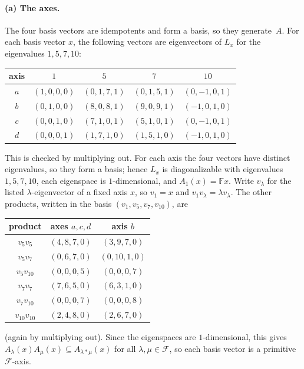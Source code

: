 \documentclass[11pt]{article}
\theoremstyle{remark}
\newcommand{\F}{\mathbb{F}}
\begin{document}
\paragraph{(a) The axes.}
The four basis vectors are idempotents and form a basis, so they generate~$A$.
For each basis vector $x$, the following vectors are eigenvectors of $L_x$ for
the eigenvalues $1,5,7,10$:
\begin{center}
\begin{tabular}{ccccc}
\toprule
axis & $1$ & $5$ & $7$ & $10$\\\midrule
$a$ & $(1,0,0,0)$ & $(0,1,7,1)$ & $(0,1,5,1)$ & $(0,-1,0,1)$\\
$b$ & $(0,1,0,0)$ & $(8,0,8,1)$ & $(9,0,9,1)$ & $(-1,0,1,0)$\\
$c$ & $(0,0,1,0)$ & $(7,1,0,1)$ & $(5,1,0,1)$ & $(0,-1,0,1)$\\
$d$ & $(0,0,0,1)$ & $(1,7,1,0)$ & $(1,5,1,0)$ & $(-1,0,1,0)$\\
\bottomrule
\end{tabular}
\end{center}
This is checked by multiplying out. For each axis the four vectors have distinct
eigenvalues, so they form a basis; hence $L_x$ is diagonalizable with
eigenvalues $1,5,7,10$, each eigenspace is $1$-dimensional, and
$A_1(x)=\F x$. Write $v_\lambda$ for the listed $\lambda$-eigenvector of a
fixed axis $x$, so $v_1=x$ and $v_1v_\lambda=\lambda v_\lambda$. The other
products, written in the basis $(v_1,v_5,v_7,v_{10})$, are
\begin{center}
\begin{tabular}{ccc}
\toprule
product & axes $a,c,d$ & axis $b$\\\midrule
$v_5v_5$ & $(4,8,7,0)$ & $(3,9,7,0)$\\
$v_5v_7$ & $(0,6,7,0)$ & $(0,10,1,0)$\\
$v_5v_{10}$ & $(0,0,0,5)$ & $(0,0,0,7)$\\
$v_7v_7$ & $(7,6,5,0)$ & $(6,3,1,0)$\\
$v_7v_{10}$ & $(0,0,0,7)$ & $(0,0,0,8)$\\
$v_{10}v_{10}$ & $(2,4,8,0)$ & $(2,6,7,0)$\\
\bottomrule
\end{tabular}
\end{center}
(again by multiplying out). Since the eigenspaces are $1$-dimensional, this
gives $A_\lambda(x)A_\mu(x)\subseteq A_{\lambda\ast\mu}(x)$ for all
$\lambda,\mu\in\mathcal F$, so each basis vector is a primitive
$\mathcal F$-axis.
\end{document}
